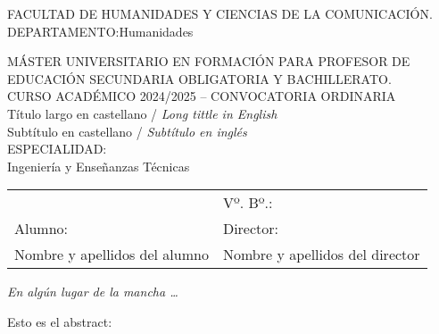\documentclass[a4paper,12pt]{report}
\begin{document}
\begin{titlepage}
    \begin{center}
        FACULTAD DE HUMANIDADES Y CIENCIAS DE LA COMUNICACIÓN.\\
        DEPARTAMENTO:\@ Humanidades

        \vspace{1.5cm}
        MÁSTER UNIVERSITARIO EN FORMACIÓN PARA PROFESOR DE EDUCACIÓN SECUNDARIA OBLIGATORIA Y BACHILLERATO.\\
        \vspace{0.5cm}
        CURSO ACADÉMICO 2024/2025 – CONVOCATORIA ORDINARIA\\

        \vspace{0.5cm}Título largo en castellano / \textit{Long tittle in English} \\
        Subtítulo en castellano / \textit{Subtítulo en inglés} \\

        \vspace{0.5cm}ESPECIALIDAD:\\
        Ingeniería y Enseñanzas Técnicas

        \vfill
        \begin{longtable}[]{p{}p{}}
                                     & Vº. Bº.:                    \\
            Alumno:                  & Director:                   \\
            Nombre y apellidos del alumno & Nombre y apellidos del director \\
        \end{longtable}
    \end{center}
\end{titlepage}

\thispagestyle{empty}
\null\vfill

\begin{flushright}
    \parbox{.4\textwidth}{%
    \par\textit{En algún lugar de la mancha \ldots}
    \newline
    \par{}
}
\end{flushright}

\vfill\vfill

\clearpage

\par{Esto es el abstract: \lipsum[1]\parencite{Loremips46:online}}
\end{document}
